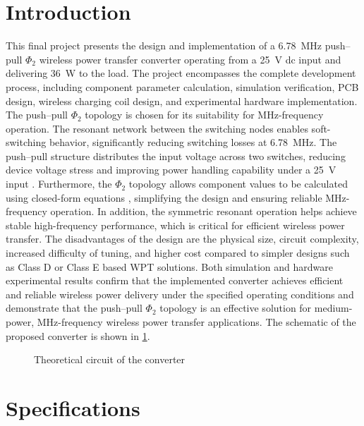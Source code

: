 \documentclass[journal, 9pt, letterpaper, english]{IEEEtran}[2015/08/26]
\begin{document}
\section{Introduction}
\label{sec:introduction}
This final project presents the design and implementation of a \qty{6.78}{\mega\hertz} push--pull $\Phi_2$ wireless power transfer converter operating from a \qty{25}{\volt} dc input and delivering \qty{36}{\watt} to the load.
The project encompasses the complete development process, including component parameter calculation, simulation verification, PCB design, wireless charging coil design, and experimental hardware implementation.
The push--pull $\Phi_2$ topology is chosen for its suitability for \unit{\mega\hertz}-frequency operation.
The resonant network between the switching nodes enables soft-switching behavior, significantly reducing switching losses at \qty{6.78}{\mega\hertz}.
The push--pull structure distributes the input voltage across two switches, reducing device voltage stress and improving power handling capability under a \qty{25}{\volt} input \cite{9039741,9458037}.
Furthermore, the $\Phi_2$ topology allows component values to be calculated using closed-form equations \cite{10833657}, simplifying the design and ensuring reliable \unit{\mega\hertz}-frequency operation.
In addition, the symmetric resonant operation helps achieve stable high-frequency performance, which is critical for efficient wireless power transfer.
The disadvantages of the design are the physical size, circuit complexity, increased difficulty of tuning, and higher cost compared to simpler designs such as Class D or Class E based WPT solutions.
Both simulation and hardware experimental results confirm that the implemented converter achieves efficient and reliable wireless power delivery under the specified operating conditions and demonstrate that the push–pull $\Phi_2$ topology is an effective solution for medium-power, \unit{\mega\hertz}-frequency wireless power transfer applications.
The schematic of the proposed converter is shown in \cref{fig:converter-overall-sch}.
\begin{figure}[!b]
	\centering
	
	\caption{Theoretical circuit of the converter}
	\label{fig:converter-overall-sch}
\end{figure}

\section{Specifications}
\end{document}
